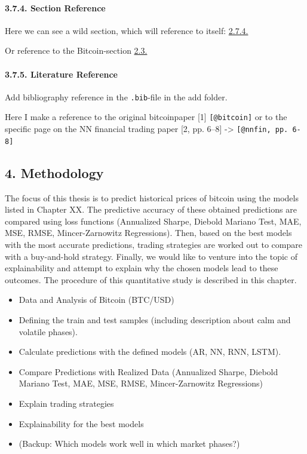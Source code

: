 \documentclass[
]{article}
\providecommand{\tightlist}{%
  \setlength{\itemsep}{0pt}\setlength{\parskip}{0pt}}
\begin{document}
\newpage

\hypertarget{sec-ref}{%
\paragraph{3.7.4. Section Reference}\label{sec-ref}}

Here we can see a wild section, which will reference to itself:
\protect\hyperlink{sec-ref}{2.7.4.}

Or reference to the Bitcoin-section \protect\hyperlink{bitcoin}{2.3.}

\newpage

\hypertarget{literature-reference}{%
\paragraph{3.7.5. Literature Reference}\label{literature-reference}}

Add bibliography reference in the \texttt{.bib}-file in the add folder.

Here I make a reference to the original bitcoinpaper {[}1{]}
\texttt{{[}@bitcoin{]}} or to the specific page on the NN financial
trading paper {[}2, pp. 6--8{]} -\textgreater{}
\texttt{{[}@nnfin,\ pp.\ 6-8{]}}

\newpage

\hypertarget{methodology}{%
\subsection{4. Methodology}\label{methodology}}

The focus of this thesis is to predict historical prices of bitcoin
using the models listed in Chapter XX. The predictive accuracy of these
obtained predictions are compared using loss functions (Annualized
Sharpe, Diebold Mariano Test, MAE, MSE, RMSE, Mincer-Zarnowitz
Regressions). Then, based on the best models with the most accurate
predictions, trading strategies are worked out to compare with a
buy-and-hold strategy. Finally, we would like to venture into the topic
of explainability and attempt to explain why the chosen models lead to
these outcomes. The procedure of this quantitative study is described in
this chapter.

\begin{itemize}
\tightlist
\item
  Data and Analysis of Bitcoin (BTC/USD)
\item
  Defining the train and test samples (including description about calm
  and volatile phases).
\item
  Calculate predictions with the defined models (AR, NN, RNN, LSTM).
\item
  Compare Predictions with Realized Data (Annualized Sharpe, Diebold
  Mariano Test, MAE, MSE, RMSE, Mincer-Zarnowitz Regressions)
\item
  Explain trading strategies
\item
  Explainability for the best models
\item
  (Backup: Which models work well in which market phases?)
\end{itemize}
\end{document}
